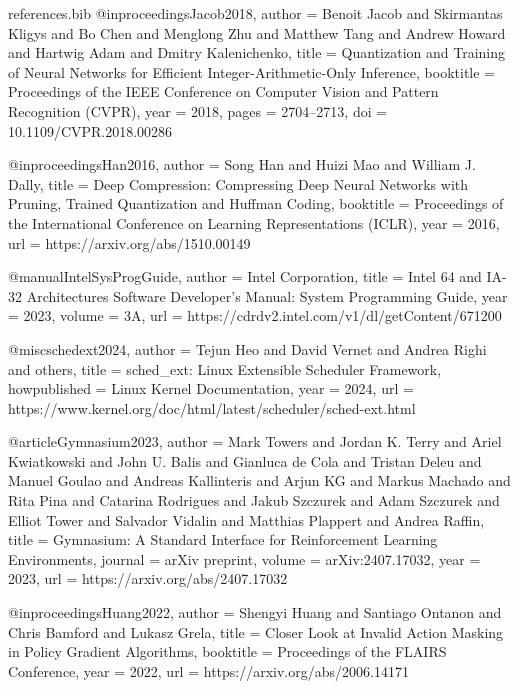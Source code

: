 \begin{filecontents*}{references.bib}
@inproceedings{Jacob2018,
  author    = {Benoit Jacob and Skirmantas Kligys and Bo Chen and Menglong Zhu and Matthew Tang and Andrew Howard and Hartwig Adam and Dmitry Kalenichenko},
  title     = {Quantization and Training of Neural Networks for Efficient Integer-Arithmetic-Only Inference},
  booktitle = {Proceedings of the IEEE Conference on Computer Vision and Pattern Recognition (CVPR)},
  year      = {2018},
  pages     = {2704--2713},
  doi       = {10.1109/CVPR.2018.00286}
}

@inproceedings{Han2016,
  author    = {Song Han and Huizi Mao and William J. Dally},
  title     = {Deep Compression: Compressing Deep Neural Networks with Pruning, Trained Quantization and Huffman Coding},
  booktitle = {Proceedings of the International Conference on Learning Representations (ICLR)},
  year      = {2016},
  url       = {https://arxiv.org/abs/1510.00149}
}

@manual{IntelSysProgGuide,
  author    = {{Intel Corporation}},
  title     = {Intel 64 and IA-32 Architectures Software Developer's Manual: System Programming Guide},
  year      = {2023},
  volume    = {3A},
  url       = {https://cdrdv2.intel.com/v1/dl/getContent/671200}
}

@misc{schedext2024,
  author    = {Tejun Heo and David Vernet and Andrea Righi and others},
  title     = {{sched\_ext}: {Linux} Extensible Scheduler Framework},
  howpublished = {Linux Kernel Documentation},
  year      = {2024},
  url       = {https://www.kernel.org/doc/html/latest/scheduler/sched-ext.html}
}

@article{Gymnasium2023,
  author    = {Mark Towers and Jordan K. Terry and Ariel Kwiatkowski and John U. Balis and Gianluca de Cola and Tristan Deleu and Manuel Goulao and Andreas Kallinteris and Arjun KG and Markus Machado and Rita Pina and Catarina Rodrigues and Jakub Szczurek and Adam Szczurek and Elliot Tower and Salvador Vidalin and Matthias Plappert and Andrea Raffin},
  title     = {Gymnasium: A Standard Interface for Reinforcement Learning Environments},
  journal   = {arXiv preprint},
  volume    = {arXiv:2407.17032},
  year      = {2023},
  url       = {https://arxiv.org/abs/2407.17032}
}

@inproceedings{Huang2022,
  author    = {Shengyi Huang and Santiago Ontanon and Chris Bamford and Lukasz Grela},
  title     = {Closer Look at Invalid Action Masking in Policy Gradient Algorithms},
  booktitle = {Proceedings of the FLAIRS Conference},
  year      = {2022},
  url       = {https://arxiv.org/abs/2006.14171}
}


\end{filecontents*}
